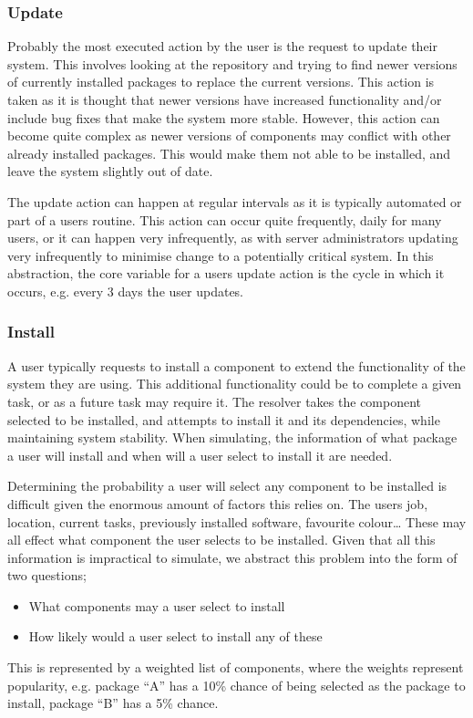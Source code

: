 \subsubsection{Update}
Probably the most executed action by the user is the request to update their system.
This involves looking at the repository and trying to find newer versions of currently installed packages to replace the current versions.
This action is taken as it is thought that newer versions have increased functionality and/or include bug fixes that make the system more stable.
However, this action can become quite complex as newer versions of components may conflict with other already installed packages.
This would make them not able to be installed, and leave the system slightly out of date.

The update action can happen at regular intervals as it is typically automated or part of a users routine.
This action can occur quite frequently, daily for many users, 
or it can happen very infrequently, 
as with server administrators updating very infrequently to minimise change to a potentially critical system.
In this abstraction, the core variable for a users update action is the cycle in which it occurs,
e.g. every 3 days the user updates.

\subsubsection{Install}
A user typically requests to install a component to extend the functionality of the system they are using.
This additional functionality could be to complete a given task, or as a future task may require it. 
The resolver takes the component selected to be installed, and attempts to install it and its dependencies, while maintaining system stability.
When simulating, the information of what package a user will install and when will a user select to install it are needed. 

Determining the probability a user will select any component to be installed is difficult given the enormous amount of factors this relies on.
The users job, location, current tasks, previously installed software, favourite colour\ldots 
These may all effect what component the user selects to be installed.
Given that all this information is impractical to simulate, we abstract this problem into the form of two questions;
\begin{itemize}
  \item What components may a user select to install
  \item How likely would a user select to install any of these
\end{itemize}
This is represented by a weighted list of components, where the weights represent popularity,
e.g. package ``A'' has a 10\% chance of being selected as the package to install, package ``B'' has a 5\% chance.

